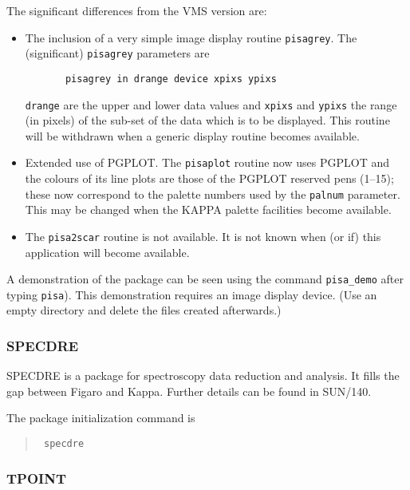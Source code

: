 The significant differences from the VMS version are:
\begin{itemize}
\item The inclusion of a very simple image display routine {\tt pisagrey}.
       The (significant) {\tt pisagrey} parameters are
\begin{verbatim}
       pisagrey in drange device xpixs ypixs
\end{verbatim}
       {\tt drange} are the upper and lower data values and {\tt xpixs} and
       {\tt ypixs}
       the range (in pixels) of the sub-set of the data which is to be
       displayed. This routine will be withdrawn when a generic
       display routine becomes available.

\item Extended use of PGPLOT. The {\tt pisaplot} routine now uses PGPLOT and
       the colours of its line plots are those of the PGPLOT reserved
       pens (1--15); these now correspond to the palette numbers
       used by the {\tt palnum} parameter. This may be changed when the KAPPA
       palette facilities become available.

\item The {\tt pisa2scar} routine is not available. It is not known when
       (or if) this application will become available.

\end{itemize}


A demonstration of the package can be seen using the command
{\tt pisa\_demo} after typing {\tt pisa}).
This demonstration requires an image display device.
(Use an empty directory and delete the files created afterwards.)

\subsubsection{SPECDRE}

SPECDRE is a package for spectroscopy data reduction and analysis.
It fills the gap between Figaro and Kappa. Further details can be
found in SUN/140.

The package initialization command is

\begin{quote}\tt
specdre
\end{quote}


\subsubsection{TPOINT}

